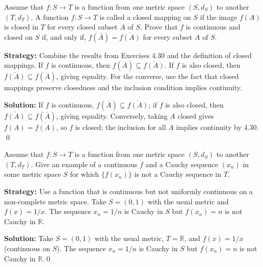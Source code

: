 \begin{problembox}
\begin{problemstatement}
Assume that $f : S \rightarrow T$ is a function from one metric space $(S, d_S)$ to another $(T, d_T)$. A function $f : S \rightarrow T$ is called a closed mapping on $S$ if the image $f(A)$ is closed in $T$ for every closed subset $A$ of $S$. Prove that $f$ is continuous and closed on $S$ if, and only if, $f(\bar{A}) = \overline{f(A)}$ for every subset $A$ of $S$.
\end{problemstatement}
\end{problembox}

\noindent\textbf{Strategy:} Combine the results from Exercises 4.30 and the definition of closed mappings. If $f$ is continuous, then $f(\overline{A}) \subseteq \overline{f(A)}$. If $f$ is also closed, then $\overline{f(A)} \subseteq f(\overline{A})$, giving equality. For the converse, use the fact that closed mappings preserve closedness and the inclusion condition implies continuity.

\bigskip\noindent\textbf{Solution:}
If $f$ is continuous, $f(\overline{A})\subseteq\overline{f(A)}$; if $f$ is also closed, then $\overline{f(A)}\subseteq f(\overline{A})$, giving equality. Conversely, taking $A$ closed gives $f(A)=\overline{f(A)}$, so $f$ is closed; the inclusion for all $A$ implies continuity by 4.30. \qed



\begin{problembox}
\begin{problemstatement}
Assume that $f : S \rightarrow T$ is a function from one metric space $(S, d_S)$ to another $(T, d_T)$. Give an example of a continuous $f$ and a Cauchy sequence $(x_n)$ in some metric space $S$ for which $\{f(x_n)\}$ is not a Cauchy sequence in $T$.
\end{problemstatement}
\end{problembox}

\noindent\textbf{Strategy:} Use a function that is continuous but not uniformly continuous on a non-complete metric space. Take $S = (0,1)$ with the usual metric and $f(x) = 1/x$. The sequence $x_n = 1/n$ is Cauchy in $S$ but $f(x_n) = n$ is not Cauchy in $\mathbb{R}$.

\bigskip\noindent\textbf{Solution:}
Take $S=(0,1)$ with the usual metric, $T=\mathbb{R}$, and $f(x)=1/x$ (continuous on $S$). The sequence $x_n=1/n$ is Cauchy in $S$ but $f(x_n)=n$ is not Cauchy in $\mathbb{R}$.\qed



